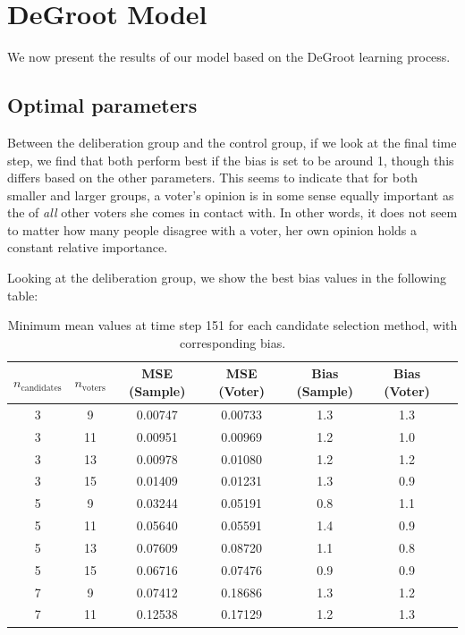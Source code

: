 \newpage
\section{DeGroot Model}
\label{degroot_results}

We now present the results of our model based on the DeGroot learning process.

\subsection{Optimal parameters}

Between the deliberation group and the control group, if we look at the final
time step, we find that both perform best if the bias is set to be around 1,
though this differs based on the other parameters. This seems to indicate that
for both smaller and larger groups, a voter's opinion is in some sense equally
important as the of  \textit{all} other voters she comes in contact with. In
other words, it does not seem to matter how many people disagree with a voter,
her own opinion holds a constant relative importance.

Looking at the deliberation group, we show the best bias values in the following table:
\begin{table}[ht]
\centering
\begin{tabular}{ccccccc}
\toprule
$n_\text{candidates}$ & $n_\text{voters}$ & MSE (Sample) & MSE (Voter) & Bias (Sample) & Bias (Voter) \\
\midrule
3 & 9  & 0.00747 & 0.00733 & 1.3 & 1.3 \\
3 & 11 & 0.00951 & 0.00969 & 1.2 & 1.0 \\
3 & 13 & 0.00978 & 0.01080 & 1.2 & 1.2 \\
3 & 15 & 0.01409 & 0.01231 & 1.3 & 0.9 \\
5 & 9  & 0.03244 & 0.05191 & 0.8 & 1.1 \\
5 & 11 & 0.05640 & 0.05591 & 1.4 & 0.9 \\
5 & 13 & 0.07609 & 0.08720 & 1.1 & 0.8 \\
5 & 15 & 0.06716 & 0.07476 & 0.9 & 0.9 \\
7 & 9  & 0.07412 & 0.18686 & 1.3 & 1.2 \\
7 & 11 & 0.12538 & 0.17129 & 1.2 & 1.3 \\
\bottomrule
\end{tabular}
\caption{Minimum mean values at time step 151 for each candidate selection method, with corresponding bias.}
\label{tab:min_mean_bias_delib}
\end{table}

